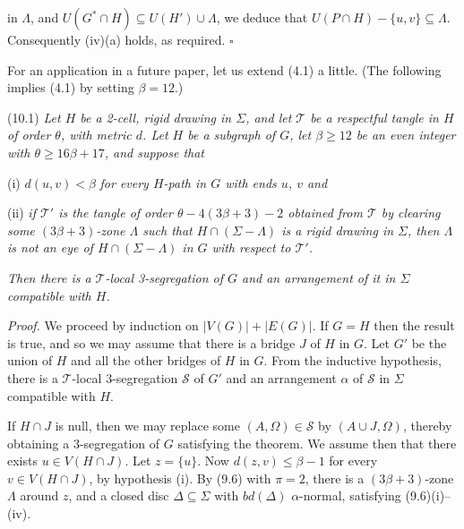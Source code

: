 \noindent in $\Lambda$, and $U(G^* \cap H) \subseteq U(H') \cup \Lambda$, we deduce that $U(P \cap H) - \{u, v\} \subseteq \Lambda$. Consequently (iv)(a) holds, as required. $\square$


For an application in a future paper, let us extend (4.1) a little. (The following implies (4.1) by setting $\beta = 12$.)

\stmt
(10.1) \textit{Let $H$ be a 2-cell, rigid drawing in $\Sigma$, and let $\mathscr{T}$ be a respectful tangle in $H$ of order $\theta$, with metric $d$. Let $H$ be a subgraph of $G$, let $\beta \ge 12$ be an even integer with $\theta \ge 16\beta + 17$, and suppose that}

\hspace*{12pt}(i) $d(u, v) < \beta$ \textit{for every $H$-path in $G$ with ends $u$, $v$ and}

\hspace*{12pt}(ii) \textit{if $\mathscr{T}'$ is the tangle of order $\theta - 4(3\beta + 3) - 2$ obtained from $\mathscr{T}$ by clearing some $(3\beta + 3)$-zone $\Lambda$ such that $H \cap (\Sigma - \Lambda)$ is a rigid drawing in $\Sigma$, then $\Lambda$ is not an eye of $H \cap (\Sigma - \Lambda)$ in $G$ with respect to $\mathscr{T}'$.}

\textit{Then there is a $\mathscr{T}$-local 3-segregation of $G$ and an arrangement of it in $\Sigma$ compatible with $H$.}

\textit{Proof.} We proceed by induction on $|V(G)| + |E(G)|$. If $G = H$ then the result is true, and so we may assume that there is a bridge $J$ of $H$ in $G$. Let $G'$ be the union of $H$ and all the other bridges of $H$ in $G$. From the inductive hypothesis, there is a $\mathscr{T}$-local 3-segregation $\mathscr{S}$ of $G'$ and an arrangement $\alpha$ of $\mathscr{S}$ in $\Sigma$ compatible with $H$.

If $H \cap J$ is null, then we may replace some $(A, \Omega) \in \mathscr{S}$ by $(A \cup J, \Omega)$, thereby obtaining a 3-segregation of $G$ satisfying the theorem. We assume then that there exists $u \in V(H \cap J)$. Let $z = \{u\}$. Now $d(z, v) \le \beta - 1$ for every $v \in V(H \cap J)$, by hypothesis (i). By (9.6) with $\pi = 2$, there is a $(3\beta + 3)$-zone $\Lambda$ around $z$, and a closed disc $\Delta \subseteq \Sigma$ with $bd(\Delta)$ $\alpha$-normal, satisfying (9.6)(i)--(iv).

